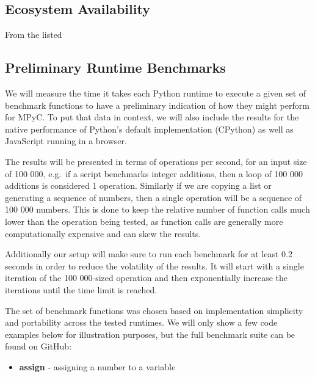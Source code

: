 \subsection{Ecosystem Availability}\label{thesis__090-mpyc-web.md__ecosystem-availability}

From the listed

\subsection{Preliminary Runtime Benchmarks}\label{thesis__090-mpyc-web.md__preliminary-runtime-benchmarks}

We will measure the time it takes each Python runtime to execute a given set of benchmark functions to have a preliminary indication of how they might perform for MPyC. To put that data in context, we will also include the results for the native performance of Python's default implementation (CPython) as well as JavaScript running in a browser.

The results will be presented in terms of operations per second, for an input size of 100 000, e.g.~if a script benchmarks integer additions, then a loop of 100 000 additions is considered 1 operation. Similarly if we are copying a list or generating a sequence of numbers, then a single operation will be a sequence of 100 000 numbers. This is done to keep the relative number of function calls much lower than the operation being tested, as function calls are generally more computationally expensive and can skew the results.

Additionally our setup will make sure to run each benchmark for at least 0.2 seconds in order to reduce the volatility of the results. It will start with a single iteration of the 100 000-sized operation and then exponentially increase the iterations until the time limit is reached.

The set of benchmark functions was chosen based on implementation simplicity and portability across the tested runtimes. We will only show a few code examples below for illustration purposes, but the full benchmark suite can be found on GitHub:

\begin{itemize}
\tightlist
\item
  \textbf{assign} - assigning a number to a variable
\end{itemize}

\begin{Shaded}
\begin{Highlighting}[]
\OperatorTok{=}\NormalTok{):}
    \NormalTok{ \_ }
\OperatorTok{=} 
\end{Highlighting}
\end{Shaded}


